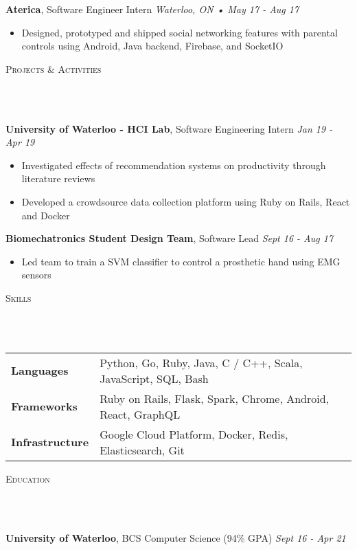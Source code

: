 \documentclass[a4paper, 12pt, hidelinks]{article}
\newcommand{\lineunder} {
    \vspace*{-8pt} \\
    \hrulefill \\
}
\newcommand{\header} [1] {
    \color{bigtext}
    {\hspace*{-4pt}\vspace*{6pt} \textsc{#1}}
    \vspace*{-6pt}
    \color{weaktext}
    \lineunder
    \vspace{6pt}
    \color{bodytext}
}
\newcommand{\nolocheader} [3] {
    \color{bigtext}\textbf{#1}, {#2}
    \color{weaktext}\hfill{\small\textit{#3}}\\
    \vspace{-3mm} \color{bodytext}
}
\newcommand{\jobheader} [4] {
    \nolocheader{#1}{#2}{\small\textit{#3} • \textit{#4}}
}
\begin{document}
\jobheader{Aterica}{Software Engineer Intern}{Waterloo, ON}{May 17 - Aug 17}
\begin{itemize}[leftmargin=1.8em] \itemsep 1pt \color{bodytext}
	\item Designed, prototyped and shipped social networking features with parental controls using Android,
    Java backend, Firebase, and SocketIO
\end{itemize}

\header{Projects \& Activities}

\nolocheader{University of Waterloo - HCI Lab}{Software Engineering Intern}{Jan 19 - Apr 19}
\begin{itemize}[leftmargin=1.8em] \itemsep 1pt \color{bodytext}
	\item Investigated effects of recommendation systems on productivity through literature reviews
	\item Developed a crowdsource data collection platform using Ruby on Rails, React and Docker
\end{itemize}

\nolocheader{Biomechatronics Student Design Team}{Software Lead}{Sept 16 - Aug 17}
\begin{itemize}[leftmargin=1.8em] \itemsep 1pt \color{bodytext}
	\item Led team to train a SVM classifier to control a prosthetic hand using EMG sensors
\end{itemize}

\header{Skills}

\hspace{-10pt}
\begin{tabular}{ l l }
    \color{bigtext}\textbf{Languages}\color{bodytext} & Python, Go, Ruby, Java, C / C++, Scala, JavaScript, SQL, Bash \\[2pt]
    \color{bigtext}\textbf{Frameworks}\color{bodytext} & Ruby on Rails, Flask, Spark, Chrome, Android, React, GraphQL \\[2pt]
    \color{bigtext}\textbf{Infrastructure}\color{bodytext} & Google Cloud Platform, Docker, Redis, Elasticsearch, Git
\end{tabular}
\vspace{3mm}

\header{Education}
\nolocheader{University of Waterloo}{BCS Computer Science (94\% GPA)}{Sept 16 - Apr 21}
\end{document}
